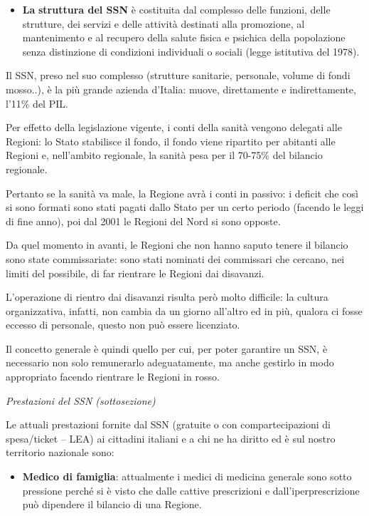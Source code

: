 \documentclass[]{article}
\begin{document}
\begin{itemize}
\item
  \textbf{La} \textbf{struttura del SSN} è costituita dal complesso
  delle funzioni, delle strutture, dei servizi e delle attività
  destinati alla promozione, al mantenimento e al recupero della salute
  fisica e psichica della popolazione senza distinzione di condizioni
  individuali o sociali (legge istitutiva del 1978).
\end{itemize}

Il SSN, preso nel suo complesso (strutture sanitarie, personale, volume
di fondi mosso..), è la più grande azienda d'Italia: muove, direttamente
e indirettamente, l'11\% del PIL.

Per effetto della legislazione vigente, i conti della sanità vengono
delegati alle Regioni: lo Stato stabilisce il fondo, il fondo viene
ripartito per abitanti alle Regioni e, nell'ambito regionale, la sanità
pesa per il 70-75\% del bilancio regionale.

Pertanto se la sanità va male, la Regione avrà i conti in passivo: i
deficit che così si sono formati sono stati pagati dallo Stato per un
certo periodo (facendo le leggi di fine anno), poi dal 2001 le Regioni
del Nord si sono opposte.

Da quel momento in avanti, le Regioni che non hanno saputo tenere il
bilancio sono state commissariate: sono stati nominati dei commissari
che cercano, nei limiti del possibile, di far rientrare le Regioni dai
disavanzi.

L'operazione di rientro dai disavanzi risulta però molto difficile: la
cultura organizzativa, infatti, non cambia da un giorno all'altro ed in
più, qualora ci fosse eccesso di personale, questo non può essere
licenziato.

Il concetto generale è quindi quello per cui, per poter garantire un
SSN, è necessario non solo remunerarlo adeguatamente, ma anche gestirlo
in modo appropriato facendo rientrare le Regioni in rosso.

\emph{Prestazioni del SSN (sottosezione)}

Le attuali prestazioni fornite dal SSN (gratuite o con compartecipazioni
di spesa/ticket -- LEA) ai cittadini italiani e a chi ne ha diritto ed è
sul nostro territorio nazionale sono:

\begin{itemize}
\item
  \textbf{Medico di famiglia}: attualmente i medici di medicina generale
  sono sotto pressione perché si è visto che dalle cattive prescrizioni
  e dall'iperprescrizione può dipendere il bilancio di una Regione.
\end{itemize}
\end{document}
